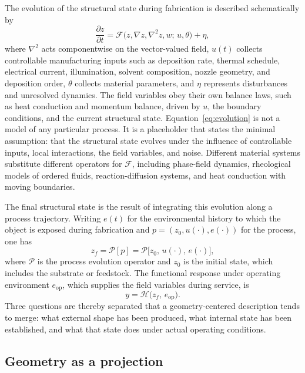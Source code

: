 \documentclass[11pt]{article}
\theoremstyle{definition}
\newcommand{\F}{\mathcal{F}}
\newcommand{\Hmap}{\mathcal{H}}
\newcommand{\Pmap}{\mathcal{P}}
\begin{document}
The evolution of the structural state during fabrication is described schematically by
\begin{equation}
\frac{\partial z}{\partial t}=\F\bigl(z,\nabla z,\nabla^{2} z,w;\,u,\theta\bigr)+\eta,
\label{eq:evolution}
\end{equation}
where $\nabla^{2}$ acts componentwise on the vector-valued field, $u(t)$ collects controllable manufacturing inputs such as deposition rate, thermal schedule, electrical current, illumination, solvent composition, nozzle geometry, and deposition order, $\theta$ collects material parameters, and $\eta$ represents disturbances and unresolved dynamics. The field variables obey their own balance laws, such as heat conduction and momentum balance, driven by $u$, the boundary conditions, and the current structural state. Equation~\eqref{eq:evolution} is not a model of any particular process. It is a placeholder that states the minimal assumption: that the structural state evolves under the influence of controllable inputs, local interactions, the field variables, and noise. Different material systems substitute different operators for $\F$, including phase-field dynamics, rheological models of ordered fluids, reaction-diffusion systems, and heat conduction with moving boundaries.

The final structural state is the result of integrating this evolution along a process trajectory. Writing $e(t)$ for the environmental history to which the object is exposed during fabrication and $p=(z_0,u(\cdot),e(\cdot))$ for the process, one has
\begin{equation}
z_f=\Pmap[p]=\Pmap\bigl[z_0,\,u(\cdot),\,e(\cdot)\bigr],
\end{equation}
where $\Pmap$ is the process evolution operator and $z_0$ is the initial state, which includes the substrate or feedstock. The functional response under operating environment $e_{\mathrm{op}}$, which supplies the field variables during service, is
\begin{equation}
y=\Hmap\bigl(z_f,\,e_{\mathrm{op}}\bigr).
\end{equation}
Three questions are thereby separated that a geometry-centered description tends to merge: what external shape has been produced, what internal state has been established, and what that state does under actual operating conditions.

\subsection{Geometry as a projection}
\end{document}
